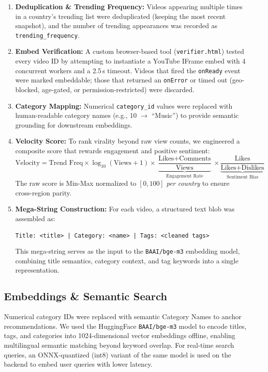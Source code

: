 \documentclass[11pt, a4paper]{report}
\begin{document}
\begin{enumerate}
    \item \textbf{Deduplication \& Trending Frequency:} Videos appearing multiple times in a country's trending list were deduplicated (keeping the most recent snapshot), and the number of trending appearances was recorded as \texttt{trending\_frequency}.

    \item \textbf{Embed Verification:} A custom browser-based tool (\texttt{verifier.html}) tested every video ID by attempting to instantiate a YouTube IFrame embed with 4 concurrent workers and a 2.5\,s timeout. Videos that fired the \texttt{onReady} event were marked embeddable; those that returned an \texttt{onError} or timed out (geo-blocked, age-gated, or permission-restricted) were discarded.

    \item \textbf{Category Mapping:} Numerical \texttt{category\_id} values were replaced with human-readable category names (e.g., 10 $\rightarrow$ ``Music'') to provide semantic grounding for downstream embeddings.

    \item \textbf{Velocity Score:} To rank virality beyond raw view counts, we engineered a composite score that rewards engagement and positive sentiment:
    $$\text{Velocity} = \text{Trend Freq} \times \log_{10}(\text{Views} + 1) \times \underbrace{\frac{\text{Likes} + \text{Comments}}{\text{Views}}}_{\text{Engagement Rate}} \times \underbrace{\frac{\text{Likes}}{\text{Likes} + \text{Dislikes}}}_{\text{Sentiment Bias}}$$
    The raw score is Min-Max normalized to $[0, 100]$ \textit{per country} to ensure cross-region parity.

    \item \textbf{Mega-String Construction:} For each video, a structured text blob was assembled as:
    \begin{center}
    \texttt{Title: <title> | Category: <name> | Tags: <cleaned tags>}
    \end{center}
    This mega-string serves as the input to the \texttt{BAAI/bge-m3} embedding model, combining title semantics, category context, and tag keywords into a single representation.
\end{enumerate}

\subsection{Embeddings \& Semantic Search}
Numerical category IDs were replaced with semantic Category Names to anchor recommendations. We used the HuggingFace \texttt{BAAI/bge-m3} model to encode titles, tags, and categories into 1024-dimensional vector embeddings offline, enabling multilingual semantic matching beyond keyword overlap. For real-time search queries, an ONNX-quantized (int8) variant of the same model is used on the backend to embed user queries with lower latency.
\end{document}
